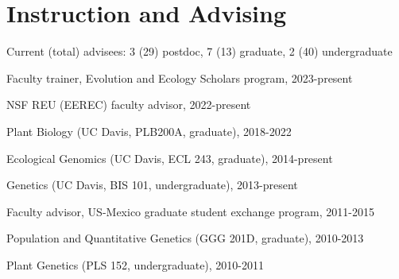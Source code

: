 \documentclass[letterpaper,10pt]{article}
\renewenvironment{itemize}{
  \begin{list}{}{
    \setlength{\leftmargin}{1.5em}
  }
}{
  \end{list}
}
\begin{document}
\section*{Instruction and Advising}
\begin{itemize}
\setlength\itemsep{0ex}
\item Current (total) advisees: 3 (29) postdoc, 7 (13) graduate, 2 (40) undergraduate 


\item Faculty trainer, Evolution and Ecology Scholars program, 2023-present
\item NSF REU (EEREC) faculty advisor, 2022-present
\item Plant Biology (UC Davis, PLB200A, graduate), 2018-2022
\item Ecological Genomics (UC Davis, ECL 243, graduate), 2014-present
\item Genetics (UC Davis, BIS 101, undergraduate), 2013-present
\item Faculty advisor, US-Mexico graduate student exchange program, 2011-2015
\item Population and Quantitative Genetics (GGG 201D, graduate), 2010-2013 %
\item Plant Genetics (PLS 152, undergraduate), 2010-2011 %

\end{itemize}
\end{document}
